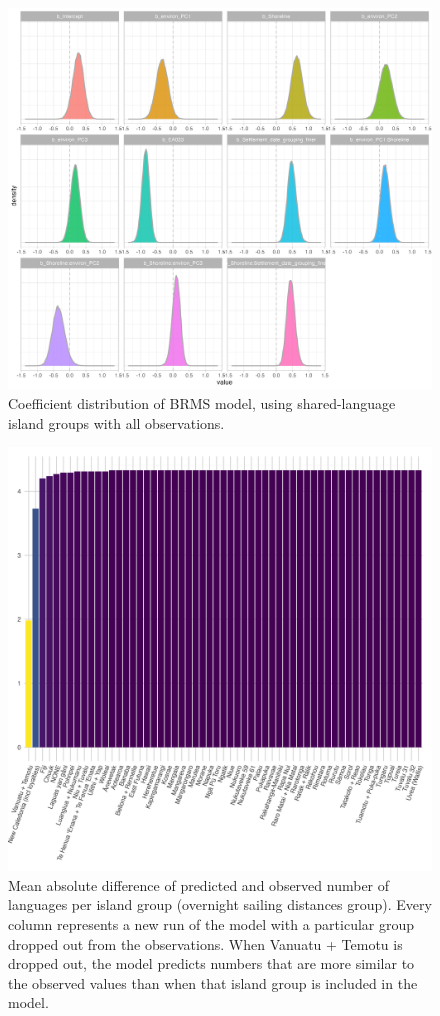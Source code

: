 \documentclass[12pt,letterpaper]{article}
\begin{document}
\begin{figure}[ht]
\includegraphics[width=15cm]{brms_medium_group_full_effect_ridge_panels_plot.png}
\caption{Coefficient distribution of BRMS model, using shared-language island groups with all observations.}
\label{brms_medium_group_full_effect_ridge_panels}
\end{figure}

\begin{figure}[ht]
\includegraphics[width=15cm]{brms_SBZR_dropped_out_plot_diff.png}
\caption{Mean absolute difference of predicted and observed number of languages per island group (overnight sailing distances group). Every column represents a new run of the model with a particular group dropped out from the observations. When Vanuatu + Temotu is dropped out, the model predicts numbers that are more similar to the observed values than when that island group is included in the model.}
\label{brms_SBZR_dropped_out_plot_diff}
\end{figure}
\end{document}
